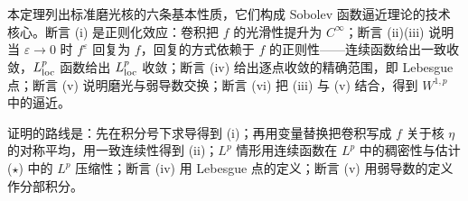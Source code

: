 \documentclass[../../main.tex]{subfiles}%
\begin{document}
\begin{remark}\label{remark:ch04-thm-4-1-动机}
本定理列出标准磨光核的六条基本性质，它们构成 Sobolev 函数逼近理论的技术核心。断言 (i) 是正则化效应：卷积把 $f$ 的光滑性提升为 $C^\infty$；断言 (ii)(iii) 说明当 $\varepsilon\to0$ 时 $f^\varepsilon$ 回复为 $f$，回复的方式依赖于 $f$ 的正则性——连续函数给出一致收敛，$L^p_{\mathrm{loc}}$ 函数给出 $L^p_{\mathrm{loc}}$ 收敛；断言 (iv) 给出逐点收敛的精确范围，即 Lebesgue 点；断言 (v) 说明磨光与弱导数交换；断言 (vi) 把 (iii) 与 (v) 结合，得到 $W^{1,p}$ 中的逼近。

证明的路线是：先在积分号下求导得到 (i)；再用变量替换把卷积写成 $f$ 关于核 $\eta$ 的对称平均，用一致连续性得到 (ii)；$L^p$ 情形用连续函数在 $L^p$ 中的稠密性与估计 ($\star$) 中的 $L^p$ 压缩性；断言 (iv) 用 Lebesgue 点的定义；断言 (v) 用弱导数的定义作分部积分。
\end{remark}
\end{document}
